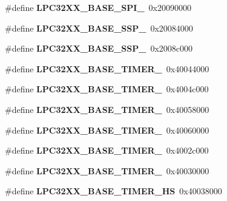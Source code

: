 \begin{DoxyCompactItemize}
\#define {\bfseries L\+P\+C32\+X\+X\+\_\+\+B\+A\+S\+E\+\_\+\+S\+P\+I\+\_}~0x20090000
\item 
\mbox{\label{group__lpc32xx__reg_ga93cdeb6b5a57e4a13727948d81da059c}} 
\#define {\bfseries L\+P\+C32\+X\+X\+\_\+\+B\+A\+S\+E\+\_\+\+S\+S\+P\+\_}~0x20084000
\item 
\mbox{\label{group__lpc32xx__reg_gadea6d3bb1fe806a4006d26f1c28820f0}} 
\#define {\bfseries L\+P\+C32\+X\+X\+\_\+\+B\+A\+S\+E\+\_\+\+S\+S\+P\+\_}~0x2008c000
\item 
\mbox{\label{group__lpc32xx__reg_gae3032780d48055ec4e4faa50088adaae}} 
\#define {\bfseries L\+P\+C32\+X\+X\+\_\+\+B\+A\+S\+E\+\_\+\+T\+I\+M\+E\+R\+\_}~0x40044000
\item 
\mbox{\label{group__lpc32xx__reg_ga88b01436c2c6236613a6f3c870584dc7}} 
\#define {\bfseries L\+P\+C32\+X\+X\+\_\+\+B\+A\+S\+E\+\_\+\+T\+I\+M\+E\+R\+\_}~0x4004c000
\item 
\mbox{\label{group__lpc32xx__reg_ga275a96182d332b29a954819679ffc09c}} 
\#define {\bfseries L\+P\+C32\+X\+X\+\_\+\+B\+A\+S\+E\+\_\+\+T\+I\+M\+E\+R\+\_}~0x40058000
\item 
\mbox{\label{group__lpc32xx__reg_gab769ac3351c78a6037de10eea6e4f539}} 
\#define {\bfseries L\+P\+C32\+X\+X\+\_\+\+B\+A\+S\+E\+\_\+\+T\+I\+M\+E\+R\+\_}~0x40060000
\item 
\mbox{\label{group__lpc32xx__reg_gab96f11def8a83b674c37ee30ef6840be}} 
\#define {\bfseries L\+P\+C32\+X\+X\+\_\+\+B\+A\+S\+E\+\_\+\+T\+I\+M\+E\+R\+\_}~0x4002c000
\item 
\mbox{\label{group__lpc32xx__reg_gaa227f34408d362457ce04518af26c904}} 
\#define {\bfseries L\+P\+C32\+X\+X\+\_\+\+B\+A\+S\+E\+\_\+\+T\+I\+M\+E\+R\+\_}~0x40030000
\item 
\mbox{\label{group__lpc32xx__reg_gade6c35f9e91b0fa08deb40bbcde79c80}} 
\#define {\bfseries L\+P\+C32\+X\+X\+\_\+\+B\+A\+S\+E\+\_\+\+T\+I\+M\+E\+R\+\_\+\+HS}~0x40038000
\item 

\end{DoxyCompactItemize}
